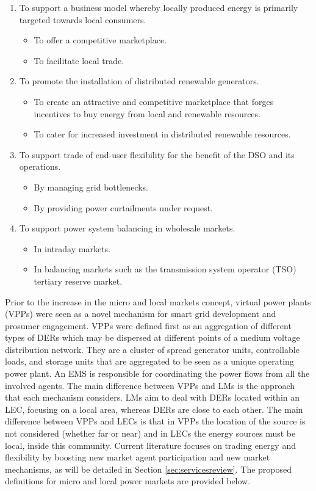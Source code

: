\begin{enumerate}
\item To support a business model whereby locally produced energy is primarily targeted towards local
consumers.
\begin{itemize}
\item To offer a competitive marketplace.
\item To facilitate local trade.
\end{itemize}
\item To promote the installation of distributed renewable generators.
\begin{itemize}
\item To create an attractive and competitive marketplace that forges incentives to buy energy from local
and renewable resources.
\item To cater for increased investment in distributed renewable resources.
\end{itemize}
\item To support trade of end-user flexibility for the benefit of the DSO and its operations.
\begin{itemize}
\item By managing grid bottlenecks.
\item By providing power curtailments under request.
\end{itemize}
\item To support power system balancing in wholesale markets.
\begin{itemize}
\item In intraday markets.
\item In balancing markets such as the transmission system operator (TSO) tertiary reserve market.
\end{itemize}
\end{enumerate}

Prior to the increase in the micro and local markets concept, virtual power plants (VPPs) were seen as a novel mechanism for smart grid development and prosumer engagement. VPPs were defined first as an aggregation of different types of DERs which may be dispersed at different points of a medium voltage distribution network. They are a cluster of spread generator units, controllable loads, and storage units that are aggregated to be seen as a unique operating power plant. An EMS is responsible for coordinating the power flows from all the involved agents. The main difference between VPPs and LMs is the approach that each mechanism considers. LMs aim to deal with DERs located within an LEC, focusing on a local area, whereas DERs are close to each other. The main difference between VPPs and LECs is that in VPPs the location of the source is not considered (whether far or near) and in LECs the energy sources must be local, inside this community. Current literature focuses on trading energy and flexibility by boosting new market agent participation and new market mechanisms, as will be detailed in Section \ref{sec:servicesreview}. The proposed definitions for micro and local power markets are provided below. 
\vspace*{3mm}

